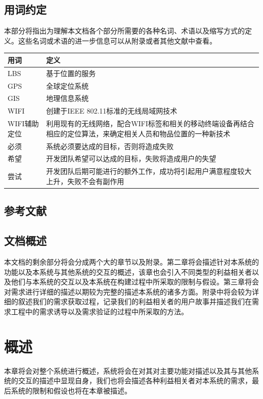 \documentclass{ctexrep}
\begin{document}
\section{用词约定}
本部分将指出为理解本文档各个部分所需要的各种名词、术语以及缩写方式的定义。这些名词或术语的进一步信息可以从附录或者其他文献中查看。
\begin{longtable}{p{2cm}|p{10cm}}
\hline
用词 & 定义 \\
\hline
\hline
LBS & 基于位置的服务\\
GPS & 全球定位系统 \\
GIS & 地理信息系统 \\
WIFI & 创建于IEEE 802.11标准的无线局域网技术 \\
WIFI辅助定位 & 利用现有的无线网络，配合WIFI标签和相关的移动终端设备再结合相应的定位算法，来确定相关人员和物品位置的一种新技术 \\
必须 & 系统必须要达成的目标，否则将造成失败 \\
希望 & 开发团队希望可以达成的目标，失败将造成用户的失望 \\
尝试 & 开发团队后期可能进行的额外工作，成功将引起用户满意程度较大上升，失败不会有副作用 \\
\hline
\end{longtable}
\section{参考文献}

\section{文档概述}
本文档的剩余部分将会分成两个大的章节以及附录。第二章将会描述针对本系统的功能以及本系统与其他系统的交互的概述，该章也会引入不同类型的利益相关者以及他们与本系统的交互以及本系统在构建过程中所采取的限制与假设。第三章将会对需求进行详细的描述以期较为完整的描述本系统的诸多方面。附录中将会较为详细的叙述我们的需求获取过程，记录我们的利益相关者的用户故事并描述我们在需求工程中的需求诱导以及需求验证的过程中所采取的方法。



\chapter{概述}
本章将会对整个系统进行概述，系统将会在对其对主要功能对描述以及其与其他系统的交互的描述中显现自身，我们也将会描述各种利益相关者对本系统的需求，最后系统的限制和假设也将在本章被描述。
\end{document}
